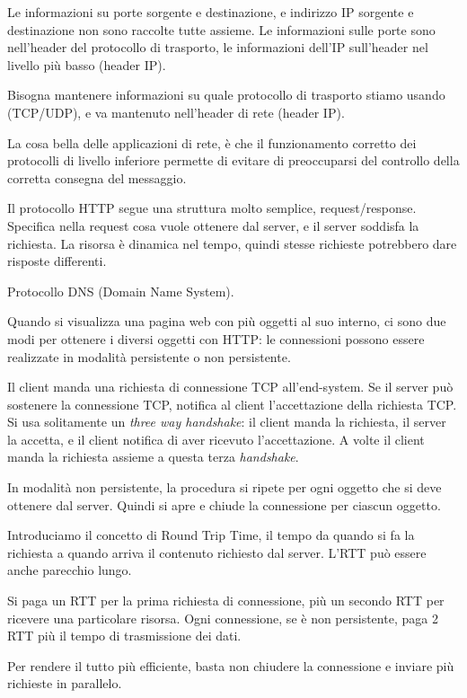 Le informazioni su porte sorgente e destinazione, e indirizzo IP sorgente e destinazione non sono raccolte tutte assieme. Le informazioni sulle porte sono nell'header del protocollo di trasporto, le informazioni dell'IP sull'header nel livello pi\`u basso (header IP).

Bisogna mantenere informazioni su quale protocollo di trasporto stiamo usando (TCP/UDP), e va mantenuto nell'header di rete (header IP).

La cosa bella delle applicazioni di rete, \`e che il funzionamento corretto dei protocolli di livello inferiore permette di evitare di preoccuparsi del controllo della corretta consegna del messaggio.

Il protocollo HTTP segue una struttura molto semplice, request/response. Specifica nella request cosa vuole ottenere dal server, e il server soddisfa la richiesta. La risorsa \`e dinamica nel tempo, quindi stesse richieste potrebbero dare risposte differenti.

Protocollo DNS (Domain Name System).

Quando si visualizza una pagina web con pi\`u oggetti al suo interno, ci sono due modi per ottenere i diversi oggetti con HTTP: le connessioni possono essere realizzate in modalit\`a persistente o non persistente.

Il client manda una richiesta di connessione TCP all'end-system. Se il server pu\`o sostenere la connessione TCP, notifica al client l'accettazione della richiesta TCP. Si usa solitamente un \emph{three way handshake}: il client manda la richiesta, il server la accetta, e il client notifica di aver ricevuto l'accettazione. A volte il client manda la richiesta assieme a questa terza \emph{handshake}.

In modalit\`a non persistente, la procedura si ripete per ogni oggetto che si deve ottenere dal server. Quindi si apre e chiude la connessione per ciascun oggetto.

Introduciamo il concetto di Round Trip Time, il tempo da quando si fa la richiesta a quando arriva il contenuto richiesto dal server. L'RTT pu\`o essere anche parecchio lungo. 

Si paga un RTT per la prima richiesta di connessione, pi\`u un secondo RTT per ricevere una particolare risorsa. Ogni connessione, se \`e non persistente, paga 2 RTT pi\`u il tempo di trasmissione dei dati.

Per rendere il tutto pi\`u efficiente, basta non chiudere la connessione e inviare pi\`u richieste in parallelo.

